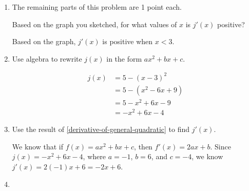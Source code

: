 \documentclass{article}
\begin{document}
\begin{enumerate}
\begin{enumerate}
\begin{solution}
    \end{solution}

  \item \label{shifted-quadratic-positive-derivative}

    \begin{grading}
      The remaining parts of this problem are 1 point each.
    \end{grading}

    \begin{problem}[\nstretch{0.5}]
      Based on the graph you sketched, for what values of $x$ is $j'(x)$ positive?
    \end{problem}

    \begin{solution}
      Based on the graph, $j'(x)$ is positive when $x<3$.
    \end{solution}

  \item

    \begin{problem}[\stretch{0.5}]
      Use algebra to rewrite $j(x)$ in the form $ax^2 + bx + c$.
    \end{problem}

    \begin{solution}
      \begin{align*}
        j(x) &= 5-(x-3)^2 \\
        &= 5-(x^2 - 6x + 9) \\
        &= 5 - x^2 + 6x - 9 \\
        &= -x^2 + 6x - 4
      \end{align*}
    \end{solution}

  \item \label{shifted-quadratic-j'}

    \begin{problem}[\stretch{0.25}]
      Use the result of \ref{derivative-of-general-quadratic} to find $j'(x)$. 
    \end{problem}

    \begin{solution}
      We know that if $f(x)=ax^2+bx+c$, then $f'(x)=2ax+b$. Since $j(x) = -x^2 + 6x - 4$, where
      $a = -1$, $b=6$, and $c=-4$, we know
      $j'(x) = 2(-1)x + 6 = -2x+6$. 
    \end{solution}

  \item \label{shifted-quadratic-j'(2)}


\end{enumerate}
\end{enumerate}
\end{document}
